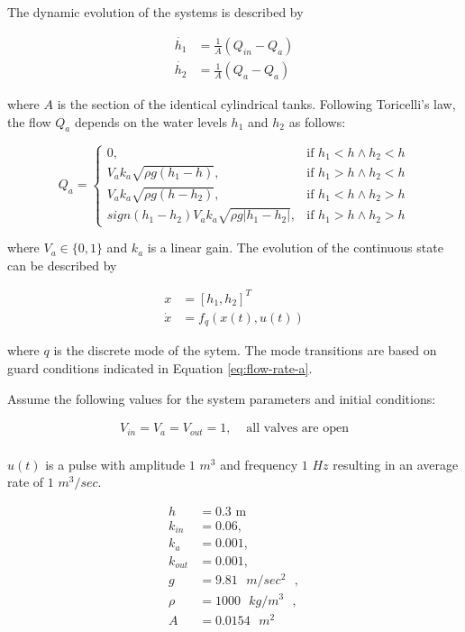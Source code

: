 \documentclass[letterpaper]{article}
\begin{document}
The dynamic evolution of the systems is described by

\begin{align}
\dot{h_1} & = \frac{1}{A} (Q_{in} - Q_{a}) \\
\dot{h_2} & = \frac{1}{A} (Q_{a} - Q_{a}) 
\end{align}

where $A$ is the section of the identical cylindrical tanks.
Following Toricelli's law, the flow $Q_{a}$ depends on 
the water levels $h_1$ and $h_2$ as follows:

\begin{equation}
Q_{a}  =  
 \begin{cases}
 0,        & \mbox{if } h_1 < h \wedge h_2 < h \\
 V_a k_a \sqrt{\rho g (h_1 - h)}, & \mbox{if } h_1 > h \wedge h_2 < h \\
 V_a k_a \sqrt{\rho g (h - h_2)}, & \mbox{if } h_1 < h \wedge h_2 > h \\
 sign(h_1 - h_2) V_a k_a \sqrt{\rho g |h_1 - h_2|}, & \mbox{if } h_1 > h \wedge h_2 > h
\end{cases}  \label{eq:flow-rate-a}
\end{equation}

where $V_a \in \{0, 1\}$ and $k_a$ is a linear gain.
The evolution of the continuous state can be described by

\begin{align}
x & = [h_1, h_2]^T \\
\dot{x} & = f_q(x(t), u(t))
\end{align}

where $q$ is the discrete mode of the sytem.
The mode transitions are based on guard conditions 
indicated in Equation \ref{eq:flow-rate-a}.

Assume the following values for the system parameters and initial conditions:

\begin{align}
 V_{in} = V_{a} = V_{out} = 1, & \mbox{  all valves are open} \\
\end{align}

$u(t)$ is a pulse with amplitude $1$ $m^3$ and frequency $1$ $Hz$ 
resulting in an average rate of $1$ $m^3/sec$.

\begin{align}
 h &= 0.3 \mbox{ m } \\
 k_{in} &= 0.06, \\
 k_{a} &= 0.001, \\ 
 k_{out} &= 0.001, \\ 
 g &= 9.81 \mbox{ $m/sec^2$ }, \\
 \rho& = 1000 \mbox{ $kg/m^3$ }, \\
 A &= 0.0154 \mbox{ $m^2$ } 
\end{align}
\end{document}
